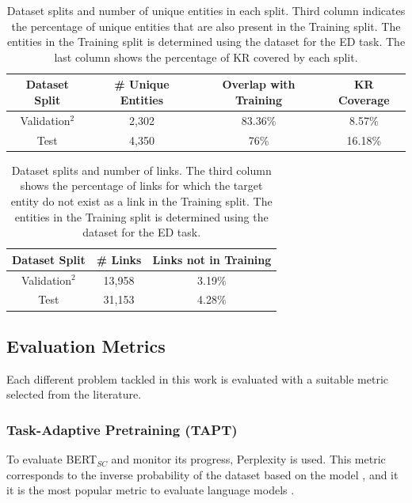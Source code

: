 \documentclass{report}
\theoremstyle{definition}
\theoremstyle{remark}
\begin{document}
\begin{table}[H]
    \centering
    \begin{tabular}{cccc}
    Dataset Split & \# Unique Entities & Overlap with Training & KR Coverage\\
    \hline
    Validation$^2$ & 2,302 & 83.36\% & 8.57\%\\
    Test & 4,350 & 76\%& 16.18\%\\
    \end{tabular}
    \caption{Dataset splits and number of unique entities in each split. Third column indicates the percentage of unique entities that are also present in the Training split. The entities in the Training split is determined using the dataset for the ED task. The last column shows the percentage of KR covered by each split.}
    \label{tab:goldstatsel2}
\end{table}

\begin{table}[H]
    \centering
    \begin{tabular}{ccc}
    Dataset Split & \# Links & Links not in Training\\
    \hline
    Validation$^2$ &  13,958 & 3.19\% \\
    Test &            31,153 & 4.28\% \\
    \end{tabular}
    \caption{Dataset splits and number of links. The third column shows the percentage of links for which the target entity do not exist as a link in the Training split. The entities in the Training split is determined using the dataset for the ED task.}
    \label{tab:goldstatsel3}
\end{table}

\subsection{Evaluation Metrics}
\label{sec:EvalExpSetupEval}
Each different problem tackled in this work is evaluated with a suitable metric selected from the literature.
\subsubsection{Task-Adaptive Pretraining (TAPT)}
To evaluate BERT$_{SC}$ and monitor its progress, Perplexity is used. This metric corresponds to the inverse probability of the dataset based on the model \cite{perplexity}, and it it is the most popular metric to evaluate language models \cite{perplexity}. 
\end{document}
